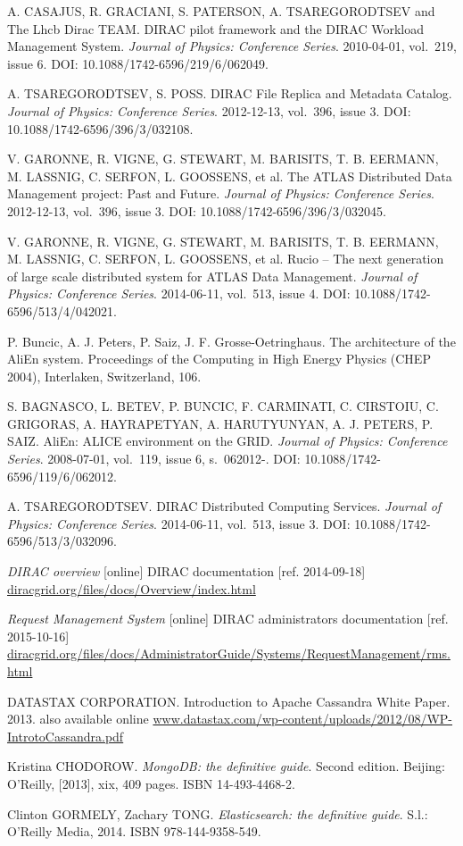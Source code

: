 \begin{thebibliography}{99}
	A. CASAJUS, R. GRACIANI, S. PATERSON, A. TSAREGORODTSEV and The Lhcb Dirac TEAM. 
	DIRAC pilot framework and the DIRAC Workload Management System. 
	\textit{Journal of Physics: Conference Series}. 2010-04-01, vol.~219, issue 6. 
	DOI: 10.1088/1742-6596/219/6/062049. 
	
	A. TSAREGORODTSEV, S. POSS. 
	DIRAC File Replica and Metadata Catalog. 
	\textit{Journal of Physics: Conference Series}. 2012-12-13, vol.~396, issue 3. 
	DOI: 10.1088/1742-6596/396/3/032108. 
	
	V. GARONNE, R. VIGNE, G. STEWART, M. BARISITS, T. B. EERMANN, M. LASSNIG, C. SERFON, L. GOOSSENS, et al. 
	The ATLAS Distributed Data Management project: Past and Future. 
	\textit{Journal of Physics: Conference Series}. 2012-12-13, vol.~396, issue 3.
	DOI: 10.1088/1742-6596/396/3/032045. 
	
	V. GARONNE, R. VIGNE, G. STEWART, M. BARISITS, T. B. EERMANN, M. LASSNIG, C. SERFON, L. GOOSSENS, et al. 
	Rucio – The next generation of large scale distributed system for ATLAS Data Management. 
	\textit{Journal of Physics: Conference Series}. 2014-06-11, vol.~513, issue 4.
	DOI: 10.1088/1742-6596/513/4/042021.
	
	P. Buncic, A. J. Peters, P. Saiz, J. F. Grosse-Oetringhaus. 
	The architecture of the AliEn system. Proceedings of the Computing in High Energy Physics (CHEP 2004), 				
	Interlaken, Switzerland, 106.
	
	S. BAGNASCO, L. BETEV, P. BUNCIC, F. CARMINATI, C. CIRSTOIU, C. GRIGORAS, A. HAYRAPETYAN, A. HARUTYUNYAN, 
	A. J. PETERS, P. SAIZ. 
	AliEn: ALICE environment on the GRID. 
	\textit{Journal of Physics: Conference Series}. 2008-07-01, vol.~119, issue 6, s.~062012-. 
	DOI: 10.1088/1742-6596/119/6/062012.
	
	A. TSAREGORODTSEV.
	DIRAC Distributed Computing Services. 
	\textit{Journal of Physics: Conference Series}. 2014-06-11, vol.~513, issue 3. 
	DOI: 10.1088/1742-6596/513/3/032096. 

	\emph{DIRAC overview} [online] 
	DIRAC documentation [ref. 2014-09-18]
	\url{diracgrid.org/files/docs/Overview/index.html}
	
	\emph{Request Management System} [online] 
	DIRAC administrators documentation [ref. 2015-10-16]
	\url{diracgrid.org/files/docs/AdministratorGuide/Systems/RequestManagement/rms.html}
	
	DATASTAX CORPORATION. Introduction to Apache Cassandra White Paper. 2013.
	also available online \url{www.datastax.com/wp-content/uploads/2012/08/WP-IntrotoCassandra.pdf}
	
	Kristina CHODOROW. \textit{MongoDB: the definitive guide}. Second edition. 
	Beijing: O'Reilly, [2013], xix, 409 pages. ISBN 14-493-4468-2. 
	
	Clinton GORMELY, Zachary TONG. \textit{Elasticsearch: the definitive guide}. S.l.: 
	O'Reilly Media, 2014. ISBN 978-144-9358-549. 
	

	

		

\end{thebibliography}

